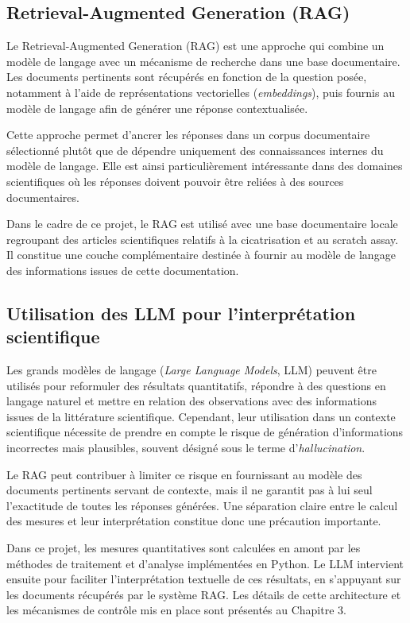 \documentclass[12pt,a4paper]{report}
\begin{document}
\subsection{Retrieval-Augmented Generation (RAG)}

Le Retrieval-Augmented Generation (RAG) \cite{ref24} est une approche qui combine un modèle de langage avec un mécanisme de recherche dans une base documentaire. Les documents pertinents sont récupérés en fonction de la question posée, notamment à l'aide de représentations vectorielles (\textit{embeddings}), puis fournis au modèle de langage afin de générer une réponse contextualisée.

Cette approche permet d'ancrer les réponses dans un corpus documentaire sélectionné plutôt que de dépendre uniquement des connaissances internes du modèle de langage. Elle est ainsi particulièrement intéressante dans des domaines scientifiques où les réponses doivent pouvoir être reliées à des sources documentaires.

Dans le cadre de ce projet, le RAG est utilisé avec une base documentaire locale regroupant des articles scientifiques relatifs à la cicatrisation et au scratch assay. Il constitue une couche complémentaire destinée à fournir au modèle de langage des informations issues de cette documentation.

\subsection{Utilisation des LLM pour l'interprétation scientifique}

Les grands modèles de langage (\textit{Large Language Models}, LLM) peuvent être utilisés pour reformuler des résultats quantitatifs, répondre à des questions en langage naturel et mettre en relation des observations avec des informations issues de la littérature scientifique. Cependant, leur utilisation dans un contexte scientifique nécessite de prendre en compte le risque de génération d'informations incorrectes mais plausibles, souvent désigné sous le terme d'\textit{hallucination}.

Le RAG peut contribuer à limiter ce risque en fournissant au modèle des documents pertinents servant de contexte, mais il ne garantit pas à lui seul l'exactitude de toutes les réponses générées. Une séparation claire entre le calcul des mesures et leur interprétation constitue donc une précaution importante.

Dans ce projet, les mesures quantitatives sont calculées en amont par les méthodes de traitement et d'analyse implémentées en Python. Le LLM intervient ensuite pour faciliter l'interprétation textuelle de ces résultats, en s'appuyant sur les documents récupérés par le système RAG. Les détails de cette architecture et les mécanismes de contrôle mis en place sont présentés au Chapitre 3.
\end{document}
